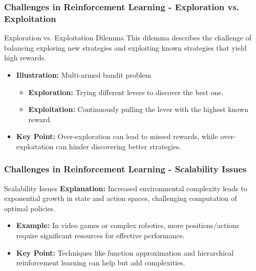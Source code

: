 \documentclass[aspectratio=169]{beamer}
\begin{document}
\begin{frame}[fragile]
    \frametitle{Challenges in Reinforcement Learning - Exploration vs. Exploitation}
    \begin{block}{Exploration vs. Exploitation Dilemma}
        This dilemma describes the challenge of balancing exploring new strategies and exploiting known strategies that yield high rewards.
    \end{block}
    \begin{itemize}
        \item \textbf{Illustration:} Multi-armed bandit problem
        \begin{itemize}
            \item \textbf{Exploration:} Trying different levers to discover the best one.
            \item \textbf{Exploitation:} Continuously pulling the lever with the highest known reward.
        \end{itemize}
        \item \textbf{Key Point:} Over-exploration can lead to missed rewards, while over-exploitation can hinder discovering better strategies.
    \end{itemize}
\end{frame}

\begin{frame}[fragile]
    \frametitle{Challenges in Reinforcement Learning - Scalability Issues}
    \begin{block}{Scalability Issues}
        \textbf{Explanation:} Increased environmental complexity leads to exponential growth in state and action spaces, challenging computation of optimal policies.
    \end{block}
    \begin{itemize}
        \item \textbf{Example:} In video games or complex robotics, more positions/actions require significant resources for effective performance.
        \item \textbf{Key Point:} Techniques like function approximation and hierarchical reinforcement learning can help but add complexities.
    \end{itemize}
\end{frame}
\end{document}
